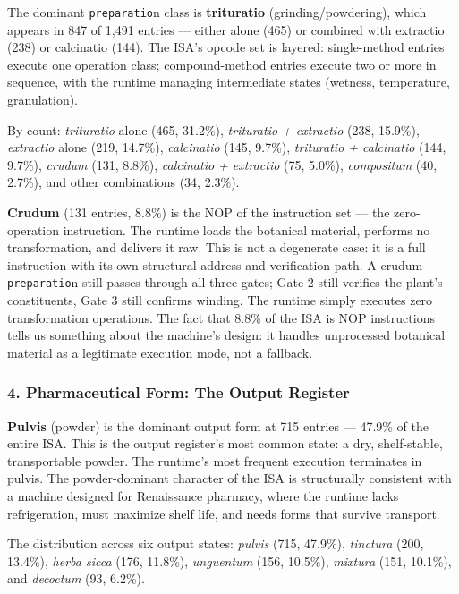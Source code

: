 \documentclass[12pt,a4paper]{article}
\begin{document}
The dominant \texttt{preparatio}n class is \textbf{trituratio}
(grinding/powdering), which appears in 847 of 1,491 entries --- either
alone (465) or combined with extractio (238) or calcinatio (144). The
ISA's opcode set is layered: single-method entries execute one operation
class; compound-method entries execute two or more in sequence, with the
runtime managing intermediate states (wetness, temperature,
granulation).

By count: \emph{trituratio} alone (465, 31.2\%), \emph{trituratio +
extractio} (238, 15.9\%), \emph{extractio} alone (219, 14.7\%),
\emph{calcinatio} (145, 9.7\%), \emph{trituratio + calcinatio} (144,
9.7\%), \emph{crudum} (131, 8.8\%), \emph{calcinatio + extractio} (75,
5.0\%), \emph{compositum} (40, 2.7\%), and other combinations (34,
2.3\%).

\textbf{Crudum} (131 entries, 8.8\%) is the NOP of the instruction set
--- the zero-operation instruction. The runtime loads the botanical
material, performs no transformation, and delivers it raw. This is not a
degenerate case: it is a full instruction with its own structural
address and verification path. A crudum \texttt{preparatio}n still
passes through all three gates; Gate 2 still verifies the plant's
constituents, Gate 3 still confirms winding. The runtime simply executes
zero transformation operations. The fact that 8.8\% of the ISA is NOP
instructions tells us something about the machine's design: it handles
unprocessed botanical material as a legitimate execution mode, not a
fallback.

\hypertarget{pharmaceutical-form-the-output-register}{%
\subsubsection{4. Pharmaceutical Form: The Output
Register}\label{pharmaceutical-form-the-output-register}}

\textbf{Pulvis} (powder) is the dominant output form at 715 entries ---
47.9\% of the entire ISA. This is the output register's most common
state: a dry, shelf-stable, transportable powder. The runtime's most
frequent execution terminates in pulvis. The powder-dominant character
of the ISA is structurally consistent with a machine designed for
Renaissance pharmacy, where the runtime lacks refrigeration, must
maximize shelf life, and needs forms that survive transport.

The distribution across six output states: \emph{pulvis} (715, 47.9\%),
\emph{tinctura} (200, 13.4\%), \emph{herba sicca} (176, 11.8\%),
\emph{unguentum} (156, 10.5\%), \emph{mixtura} (151, 10.1\%), and
\emph{decoctum} (93, 6.2\%).
\end{document}
